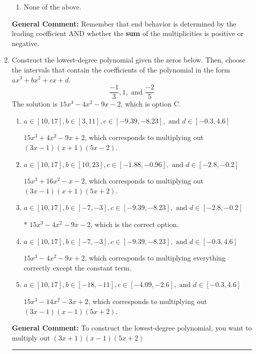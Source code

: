 \documentclass{extbook}[14pt]
\newcommand{\litem}[1]{\item #1

\rule{\textwidth}{0.4pt}}
\begin{document}
\begin{enumerate}
{\begin{enumerate}[label=\Alph*.]
\item None of the above.\end{enumerate}
\textbf{General Comment:} Remember that end behavior is determined by the leading coefficient AND whether the \textbf{sum} of the multiplicities is positive or negative.
}
\litem{
Construct the lowest-degree polynomial given the zeros below. Then, choose the intervals that contain the coefficients of the polynomial in the form $ax^3+bx^2+cx+d$.
\[ \frac{-1}{3}, 1, \text{ and } \frac{-2}{5} \]The solution is \( 15x^{3} -4 x^{2} -9 x -2 \), which is option C.\begin{enumerate}[label=\Alph*.]
\item \( a \in [10, 17], b \in [3, 11], c \in [-9.39, -8.23], \text{ and } d \in [-0.3, 4.6] \)

$15x^{3} +4 x^{2} -9 x + 2$, which corresponds to multiplying out $(3x -1)(x + 1)(5x -2)$.
\item \( a \in [10, 17], b \in [10, 23], c \in [-1.88, -0.96], \text{ and } d \in [-2.8, -0.2] \)

$15x^{3} +16 x^{2} -x -2$, which corresponds to multiplying out $(3x -1)(x + 1)(5x + 2)$.
\item \( a \in [10, 17], b \in [-7, -3], c \in [-9.39, -8.23], \text{ and } d \in [-2.8, -0.2] \)

* $15x^{3} -4 x^{2} -9 x -2$, which is the correct option.
\item \( a \in [10, 17], b \in [-7, -3], c \in [-9.39, -8.23], \text{ and } d \in [-0.3, 4.6] \)

$15x^{3} -4 x^{2} -9 x + 2$, which corresponds to multiplying everything correctly except the constant term.
\item \( a \in [10, 17], b \in [-18, -11], c \in [-4.09, -2.6], \text{ and } d \in [-0.3, 4.6] \)

$15x^{3} -14 x^{2} -3 x + 2$, which corresponds to multiplying out $(3x -1)(x -1)(5x + 2)$.
\end{enumerate}

\textbf{General Comment:} To construct the lowest-degree polynomial, you want to multiply out $(3x + 1)(x -1)(5x + 2)$
}
\end{enumerate}
\end{document}
